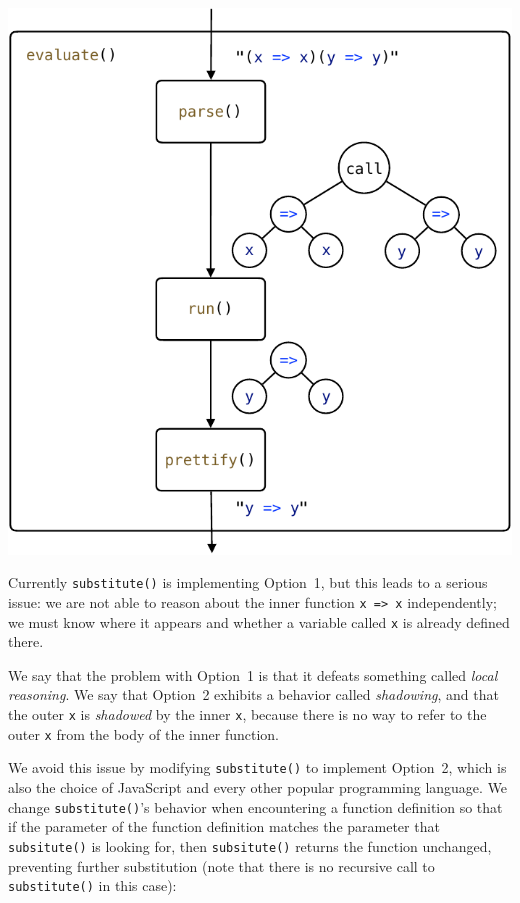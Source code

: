 \documentclass[12pt, oneside]{book}
\begin{document}
\begin{center}
\includegraphics[page = 7]{images.pdf}
\end{center}

Currently \texttt{substitute()} is implementing Option~1, but this leads to a serious issue: we are not able to reason about the inner function \texttt{x => x} independently; we must know where it appears and whether a variable called \texttt{x} is already defined there.

\begin{mdframed}[frametitle = {Technical Terms}]
We say that the problem with Option~1 is that it defeats something called \emph{local reasoning}. We say that Option~2 exhibits a behavior called \emph{shadowing}, and that the outer \texttt{x} is \emph{shadowed} by the inner \texttt{x}, because there is no way to refer to the outer \texttt{x} from the body of the inner function.
\end{mdframed}

We avoid this issue by modifying \texttt{substitute()} to implement Option~2, which is also the choice of JavaScript and every other popular programming language. We change \texttt{substitute()}’s behavior when encountering a function definition so that if the parameter of the function definition matches the parameter that \texttt{subsitute()} is looking for, then \texttt{subsitute()} returns the function unchanged, preventing further substitution (note that there is no recursive call to \texttt{substitute()} in this case):
\end{document}
